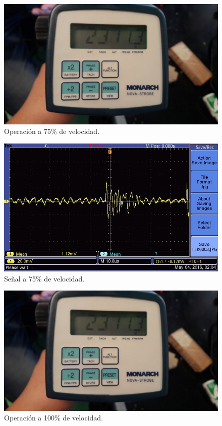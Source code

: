   \begin{figure}[!htbp]
 \centering
 \includegraphics [scale=0.2]
 {./img/2311.jpg}
  \caption{Operaci\'on a 75\% de velocidad.}
 \end{figure}

  \begin{figure}[!htbp]
 \centering
 \includegraphics [scale=0.25]
 {./img/tek0003.jpg}
  \caption{Se\~nal a 75\% de velocidad.}
 \end{figure}

  \begin{figure}[!htbp]
 \centering
 \includegraphics [scale=0.2]
 {./img/2311.jpg}
  \caption{Operaci\'on a 100\% de velocidad.}
 \end{figure}

